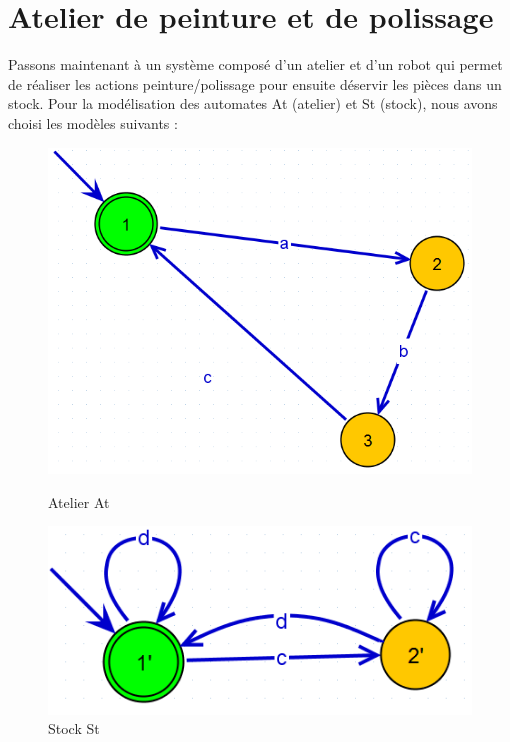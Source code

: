 \chapter{Atelier de peinture et de polissage}
Passons maintenant à un système composé d'un atelier et d'un robot qui permet de réaliser les actions peinture/polissage pour ensuite déservir les pièces dans un stock. Pour la modélisation des automates At (atelier) et St (stock), nous avons choisi les modèles suivants :
\begin{figure}[!ht]
\begin{minipage}{.5\textwidth}
\centering
\includegraphics[width=\textwidth]{./II/images/At.png}
\caption{Atelier At}
\end{minipage} \hfill
\begin{minipage}{.5\textwidth}
\centering
\includegraphics[width=\textwidth]{./II/images/St.png}
\caption{Stock St}
\end{minipage}
\end{figure}


